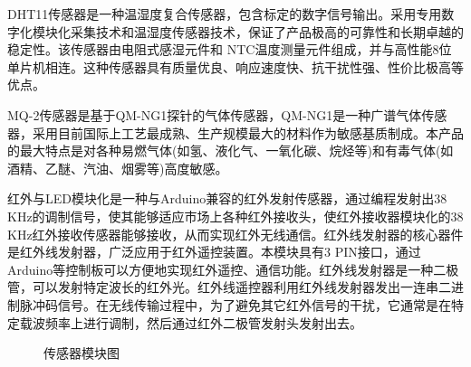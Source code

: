 DHT11传感器是一种温湿度复合传感器，包含标定的数字信号输出。采用专用数字化模块化采集技术和温湿度传感器技术，保证了产品极高的可靠性和长期卓越的稳定性。该传感器由电阻式感湿元件和 NTC温度测量元件组成，并与高性能8位单片机相连。这种传感器具有质量优良、响应速度快、抗干扰性强、性价比极高等优点。

MQ-2传感器是基于QM-NG1探针的气体传感器，QM-NG1是一种广谱气体传感器，采用目前国际上工艺最成熟、生产规模最大的材料作为敏感基质制成。本产品的最大特点是对各种易燃气体(如氢、液化气、一氧化碳、烷烃等)和有毒气体(如酒精、乙醚、汽油、烟雾等)高度敏感。

红外与LED模块化是一种与Arduino兼容的红外发射传感器，通过编程发射出38 KHz的调制信号，使其能够适应市场上各种红外接收头，使红外接收器模块化的38 KHz红外接收传感器能够接收，从而实现红外无线通信。红外线发射器的核心器件是红外线发射器，广泛应用于红外遥控装置。本模块具有3 PIN接口，通过 Arduino等控制板可以方便地实现红外遥控、通信功能。红外线发射器是一种二极管，可以发射特定波长的红外光。红外线遥控器利用红外线发射器发出一连串二进制脉冲码信号。在无线传输过程中，为了避免其它红外信号的干扰，它通常是在特定载波频率上进行调制，然后通过红外二极管发射头发射出去。

\begin{figure}[htbp]
	\centering
	\caption{传感器模块图}
	\label{fig:2-3}
\end{figure}



